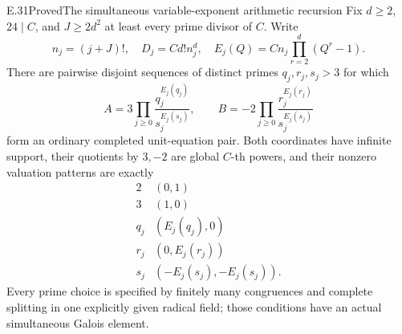 \begin{result}{E.31}{Proved}{The simultaneous variable-exponent arithmetic recursion}
\label{coh:variable-arithmetic}
Fix $d\ge2$, $24\mid C$, and $J\ge2d^2$ at least every prime
divisor of $C$.  Write
\[
 n_j=(j+J)!,\quad D_j=Cd!n_j^d,\quad
 E_j(Q)=Cn_j\prod_{r=2}^d(Q^r-1).
 \tag{E.31.1}
\]
There are pairwise disjoint sequences of distinct primes
$q_j,r_j,s_j>3$ for which
\[
 A=3\prod_{j\ge0}\frac{q_j^{E_j(q_j)}}{s_j^{E_j(s_j)}},\qquad
 B=-2\prod_{j\ge0}\frac{r_j^{E_j(r_j)}}{s_j^{E_j(s_j)}}
 \tag{E.31.2}
\]
form an ordinary completed unit-equation pair.  Both coordinates have
infinite support, their quotients by $3,-2$ are global $C$-th powers,
and their nonzero valuation patterns are exactly
\[
 \begin{array}{c|c}
 2&(0,1)\\3&(1,0)\\
 q_j&(E_j(q_j),0)\\r_j&(0,E_j(r_j))\\
 s_j&(-E_j(s_j),-E_j(s_j)).
 \end{array}
 \tag{E.31.3}
\]
Every prime choice is specified by finitely many congruences and
complete splitting in one explicitly given radical field; those
conditions have an actual simultaneous Galois element.
\end{result}
